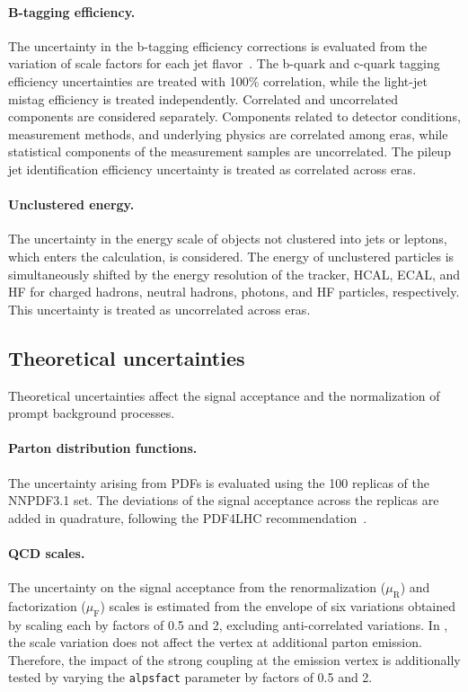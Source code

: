 \paragraph{B-tagging efficiency.}
The uncertainty in the b-tagging efficiency corrections is evaluated from the variation of scale factors for each jet flavor~\cite{CMS:2017wtu,Bols:2020bkb,CMS-DP-2023-005,CMS-DP-2023-012}. The b-quark and c-quark tagging efficiency uncertainties are treated with 100\% correlation, while the light-jet mistag efficiency is treated independently. Correlated and uncorrelated components are considered separately. Components related to detector conditions, measurement methods, and underlying physics are correlated among eras, while statistical components of the measurement samples are uncorrelated. The pileup jet identification efficiency uncertainty is treated as correlated across eras.

\paragraph{Unclustered energy.}
The uncertainty in the energy scale of objects not clustered into jets or leptons, which enters the \ptmiss calculation, is considered. The energy of unclustered particles is simultaneously shifted by the energy resolution of the tracker, HCAL, ECAL, and HF for charged hadrons, neutral hadrons, photons, and HF particles, respectively. This uncertainty is treated as uncorrelated across eras.

\subsection{Theoretical uncertainties}
\label{ssec:syst_theoretical}

Theoretical uncertainties affect the signal acceptance and the normalization of prompt background processes.

\paragraph{Parton distribution functions.}
The uncertainty arising from PDFs is evaluated using the 100 replicas of the NNPDF3.1 set. The deviations of the signal acceptance across the replicas are added in quadrature, following the PDF4LHC recommendation~\cite{PDF4LHC}.

\paragraph{QCD scales.}
The uncertainty on the signal acceptance from the renormalization ($\mu_{\mathrm{R}}$) and factorization ($\mu_{\mathrm{F}}$) scales is estimated from the envelope of six variations obtained by scaling each by factors of 0.5 and 2, excluding anti-correlated variations. In \MGvATNLO, the scale variation does not affect the vertex at additional parton emission. Therefore, the impact of the strong coupling at the emission vertex is additionally tested by varying the \texttt{alpsfact} parameter by factors of 0.5 and 2.

